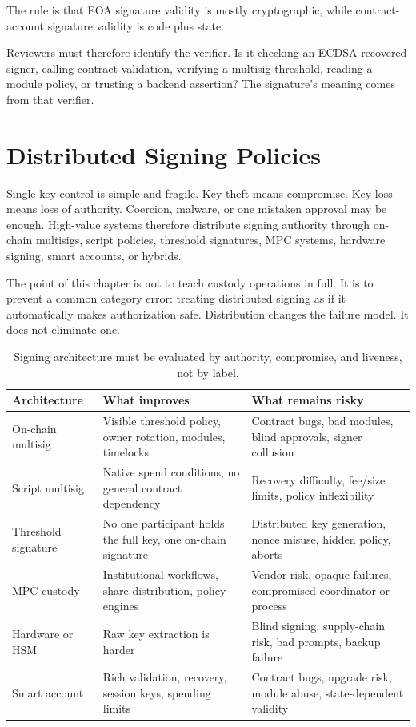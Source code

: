 The rule is that EOA signature validity is mostly cryptographic, while contract-account signature validity is code plus state.

Reviewers must therefore identify the verifier. Is it checking an ECDSA recovered signer, calling contract validation, verifying a multisig threshold, reading a module policy, or trusting a backend assertion? The signature's meaning comes from that verifier.

\section{Distributed Signing Policies}

Single-key control is simple and fragile. Key theft means compromise. Key loss means loss of authority. Coercion, malware, or one mistaken approval may be enough. High-value systems therefore distribute signing authority through on-chain multisigs, script policies, threshold signatures, MPC systems, hardware signing, smart accounts, or hybrids.

The point of this chapter is not to teach custody operations in full. It is to prevent a common category error: treating distributed signing as if it automatically makes authorization safe. Distribution changes the failure model. It does not eliminate one.

\begin{table}[htbp]
\centering
\small
\renewcommand{\arraystretch}{1.18}
\begin{tabularx}{\textwidth}{@{}>{\RaggedRight\arraybackslash}p{}>{\RaggedRight\arraybackslash}p{}X@{}}
\toprule
Architecture & What improves & What remains risky \\
\midrule
On-chain multisig & Visible threshold policy, owner rotation, modules, timelocks & Contract bugs, bad modules, blind approvals, signer collusion \\
Script multisig & Native spend conditions, no general contract dependency & Recovery difficulty, fee/size limits, policy inflexibility \\
Threshold signature & No one participant holds the full key, one on-chain signature & Distributed key generation, nonce misuse, hidden policy, aborts \\
MPC custody & Institutional workflows, share distribution, policy engines & Vendor risk, opaque failures, compromised coordinator or process \\
Hardware or HSM & Raw key extraction is harder & Blind signing, supply-chain risk, bad prompts, backup failure \\
Smart account & Rich validation, recovery, session keys, spending limits & Contract bugs, upgrade risk, module abuse, state-dependent validity \\
\bottomrule
\end{tabularx}
\caption{Signing architecture must be evaluated by authority, compromise, and liveness, not by label.}
\end{table}

